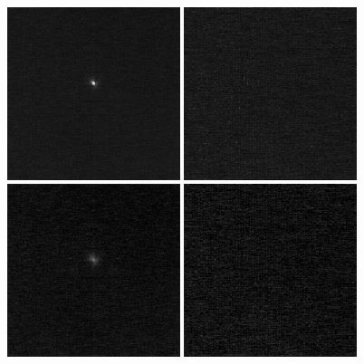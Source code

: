 \documentclass[12pt]{article}
\begin{document}
\newpage

\begin{figure}[H]
\centering
\includegraphics[width=0.45\textwidth]{image.jpg}
\includegraphics[width=0.45\textwidth]{corner.jpg}
\includegraphics[width=0.45\textwidth]{image_root.png}
\includegraphics[width=0.45\textwidth]{corner_root.png}

\end{figure}
\end{document}
